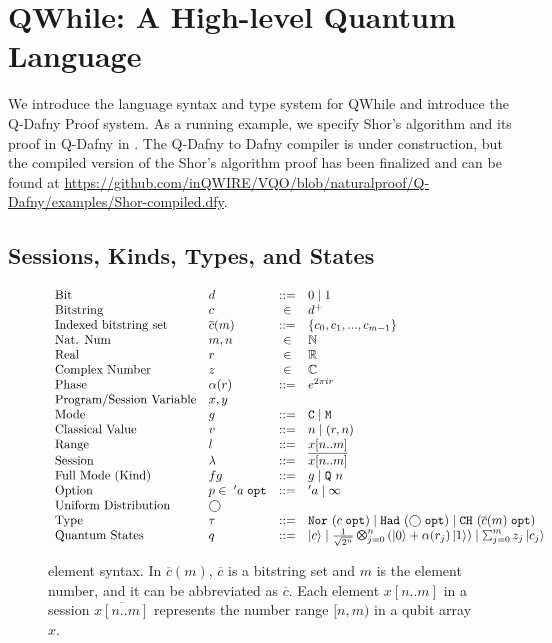 \section{QWhile: A High-level Quantum Language}
\label{sec:vqir}

We introduce the language syntax and type system for QWhile and introduce the Q-Dafny Proof system.
As a running example, we specify Shor's algorithm and its proof in Q-Dafny in .
The Q-Dafny to Dafny compiler is under construction, but the compiled version of the Shor's algorithm proof has been finalized
and can be found at \url{https://github.com/inQWIRE/VQO/blob/naturalproof/Q-Dafny/examples/Shor-compiled.dfy}.

\subsection{Sessions, Kinds, Types, and States}\label{sec:state}

\begin{figure}[t]
{
  \small
  \[\begin{array}{llcl} 
      \text{Bit} & d & ::= & 0\mid 1       \\
      \text{Bitstring} & c & \in & d^{+}       \\
      \text{Indexed bitstring set} & \overline{c}(m) & ::= & \{c_0,c_1,...,c_{m-1}\}       \\
      \text{Nat. Num} & m, n & \in & \mathbb{N}       \\
      \text{Real} & r & \in & \mathbb{R}\\
      \text{Complex Number} & z & \in & \mathbb{C} \\
      \text{Phase} & \alpha(r) & ::= & e^{2\pi i r} \\
      \text{Program/Session Variable} & x,y \\
      \text{Mode} & g & ::= & \cmode  \mid \mmode\\
      \text{Classical Value} & v & ::= & n \mid (r,n)\\
      \text{Range} & l & ::= & x[n..m] \\
      \text{Session} & \lambda & ::= & \overline{x[n..m]} \\
      \text{Full Mode (Kind)} & fg & ::= & g \mid \qmode{n} \\
      \text{Option} & p \in\; \topt{'a} & ::= & 'a \mid \infty \\
      \text{Uniform Distribution} & \bigcirc \\
      \text{Type} & \tau & ::= & \tnor{(\topt{c})}\mid \thad{(\topt{\bigcirc})}
                    \mid \tch{(\topt{\overline{c}(m)})} \\
      \text{Quantum States} & q & ::= & \ket{c}\mid \shad{2^n}{n}{\alpha(r_j)} \mid \sch{m}{z_j}{c_j} \\
    \end{array}
  \]
}
  \caption{\qafny element syntax. In $\overline{c}(m)$, $\overline{c}$ is a bitstring set and $m$ is the element number, and it can be abbreviated as $\overline{c}$. Each element $x[n..m]$ in a session $\overline{x[n..m]}$ represents the number range $[n,m)$ in a qubit array $x$. }
  \label{fig:qafny-state}
\end{figure}

